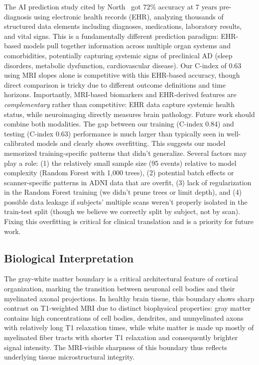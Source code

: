 \documentclass[blue]{ludusofficial}  %
\begin{document}
The AI prediction study cited by North~\cite{north2025breakthroughs} got 72\% accuracy at 7 years pre-diagnosis using electronic health records (EHR), analyzing thousands of structured data elements including diagnoses, medications, laboratory results, and vital signs. This is a fundamentally different prediction paradigm: EHR-based models pull together information across multiple organ systems and comorbidities, potentially capturing systemic signs of preclinical AD (sleep disorders, metabolic dysfunction, cardiovascular disease). Our C-index of 0.63 using MRI slopes alone is competitive with this EHR-based accuracy, though direct comparison is tricky due to different outcome definitions and time horizons. Importantly, MRI-based biomarkers and EHR-derived features are \textit{complementary} rather than competitive: EHR data capture systemic health status, while neuroimaging directly measures brain pathology. Future work should combine both modalities. The gap between our training (C-index 0.84) and testing (C-index 0.63) performance is much larger than typically seen in well-calibrated models and clearly shows overfitting. This suggests our model memorized training-specific patterns that didn't generalize. Several factors may play a role: (1) the relatively small sample size (95 events) relative to model complexity (Random Forest with 1,000 trees), (2) potential batch effects or scanner-specific patterns in ADNI data that are overfit, (3) lack of regularization in the Random Forest training (we didn't prune trees or limit depth), and (4) possible data leakage if subjects' multiple scans weren't properly isolated in the train-test split (though we believe we correctly split by subject, not by scan). Fixing this overfitting is critical for clinical translation and is a priority for future work.

\subsection{Biological Interpretation}

The gray-white matter boundary is a critical architectural feature of cortical organization, marking the transition between neuronal cell bodies and their myelinated axonal projections. In healthy brain tissue, this boundary shows sharp contrast on T1-weighted MRI due to distinct biophysical properties: gray matter contains high concentrations of cell bodies, dendrites, and unmyelinated axons with relatively long T1 relaxation times, while white matter is made up mostly of myelinated fiber tracts with shorter T1 relaxation and consequently brighter signal intensity. The MRI-visible sharpness of this boundary thus reflects underlying tissue microstructural integrity.
\end{document}

